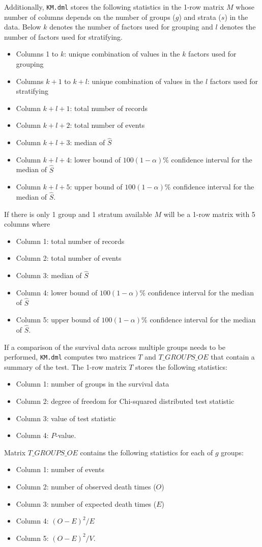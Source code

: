 Additionally, {\tt KM.dml} stores the following statistics in the 1-row matrix $M$ whose number of columns depends on the number of groups ($g$) and strata ($s$) in the data. Below $k$ denotes the number of factors used for grouping and $l$ denotes the number of factors used for stratifying. 
\begin{itemize}
	\item Columns 1 to $k$: unique combination of values in the $k$ factors used for grouping 
	\item Columns $k+1$ to $k+l$: unique combination of values in the $l$ factors used for stratifying  
	\item Column $k+l+1$: total number of records 
	\item Column $k+l+2$: total number of events
    \item Column $k+l+3$: median of $\hat{S}$
    \item Column $k+l+4$: lower bound of $100(1-\alpha)\%$ confidence interval for the median of $\hat{S}$
    \item Column $k+l+5$: upper bound of $100(1-\alpha)\%$ confidence interval for the median of $\hat{S}$. 
\end{itemize}
If there is only 1 group and 1 stratum available $M$ will be a 1-row matrix with 5 columns where
\begin{itemize}
	\item Column 1: total number of records
	\item Column 2: total number of events
	\item Column 3: median of $\hat{S}$
	\item Column 4: lower bound of $100(1-\alpha)\%$ confidence interval for the median of $\hat{S}$
	\item Column 5: upper bound of $100(1-\alpha)\%$ confidence interval for the median of $\hat{S}$.
\end{itemize} 

If a comparison of the survival data across multiple groups needs to be performed, {\tt KM.dml} computes two matrices $T$ and $T\_GROUPS\_OE$ that contain a summary of the test. The 1-row matrix $T$ stores the following statistics: 
\begin{itemize}
	\item Column 1: number of groups in the survival data
 	\item Column 2: degree of freedom for Chi-squared distributed test statistic
	\item Column 3: value of test statistic
	\item Column 4: $P$-value.
\end{itemize}
Matrix $T\_GROUPS\_OE$ contains the following statistics for each of $g$ groups:
\begin{itemize}
	\item Column 1: number of events
	\item Column 2: number of observed death times ($O$)
	\item Column 3: number of expected death times ($E$)
	\item Column 4: $(O-E)^2/E$
	\item Column 5: $(O-E)^2/V$.
\end{itemize}



